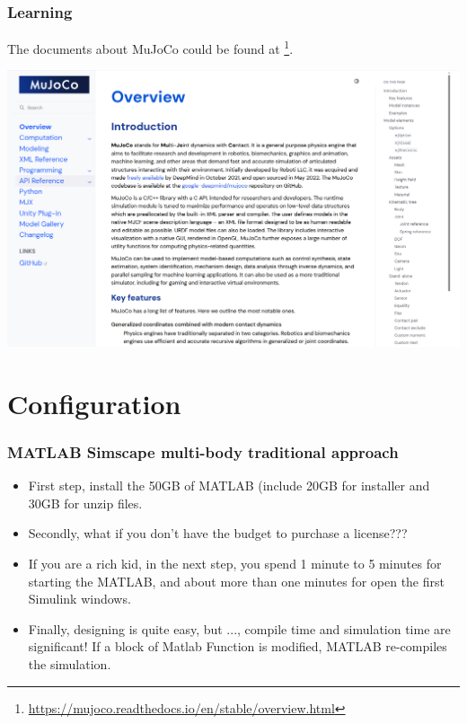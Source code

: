 \documentclass[9pt]{beamer}
\begin{document}
	\begin{frame}
		\frametitle{Learning}
		The documents about MuJoCo could be found at
		\footnote{\href{https://mujoco.readthedocs.io/en/stable/overview.html}{https://mujoco.readthedocs.io/en/stable/overview.html}}.
		\begin{center}
			\includegraphics[width=0.8\linewidth]{images/gg-mjc-overview}
		\end{center}
		
	\end{frame}


	
	
	\section{Configuration}
	
	\begin{frame}
		\frametitle{MATLAB Simscape multi-body traditional approach}
		\begin{itemize}
			\item First step, install the 50GB of MATLAB (include 20GB for installer and 30GB for unzip files.
			\item Secondly, what if you don’t have the budget to purchase a license???
			\item If you are a rich kid, in the next step, you spend 1 minute to 5 minutes for starting the MATLAB, and about more than one minutes for open the first Simulink windows.
			\item Finally, designing is quite easy, but ..., compile time and simulation time are significant! If a block of Matlab Function is modified, MATLAB re-compiles the simulation.
		\end{itemize}
	\end{frame}
\end{document}
